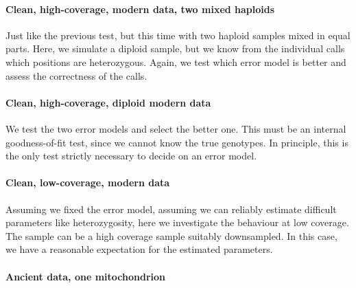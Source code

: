 \documentclass{article}
\begin{document}

\paragraph{Clean, high-coverage, modern data, two mixed haploids}

Just like the previous test, but this time with two haploid samples
mixed in equal parts.  Here, we simulate a diploid sample, but we know
from the individual calls which positions are heterozygous.  Again, we
test which error model is better and assess the correctness of the
calls.


\paragraph{Clean, high-coverage, diploid modern data}

We test the two error models and select the better one.  This must be an
internal goodness-of-fit test, since we cannot know the true genotypes.
In principle, this is the only test strictly necessary to decide on an
error model.


\paragraph{Clean, low-coverage, modern data}

Assuming we fixed the error model, assuming we can reliably estimate
difficult parameters like heterozygosity, here we investigate the
behaviour at low coverage.  The sample can be a high coverage sample
suitably downsampled.  In this case, we have a reasonable expectation
for the estimated parameters.

\paragraph{Ancient data, one mitochondrion}
\end{document}
